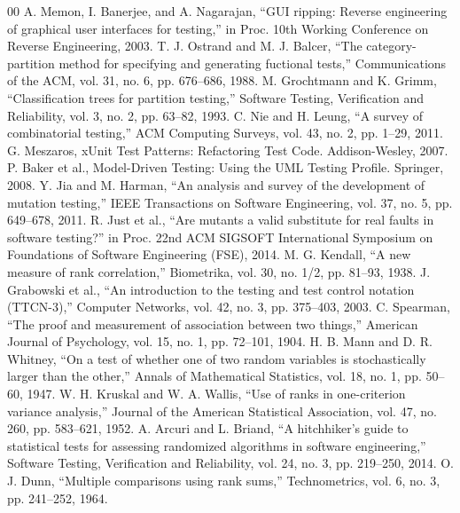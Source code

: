 \documentclass[conference]{IEEEtran}
\begin{document}
\begin{thebibliography}{00}
 A. Memon, I. Banerjee, and A. Nagarajan, ``GUI ripping: Reverse engineering of graphical user interfaces for testing,'' in Proc. 10th Working Conference on Reverse Engineering, 2003.
 T. J. Ostrand and M. J. Balcer, ``The category-partition method for specifying and generating fuctional tests,'' Communications of the ACM, vol. 31, no. 6, pp. 676--686, 1988.
 M. Grochtmann and K. Grimm, ``Classification trees for partition testing,'' Software Testing, Verification and Reliability, vol. 3, no. 2, pp. 63--82, 1993.
 C. Nie and H. Leung, ``A survey of combinatorial testing,'' ACM Computing Surveys, vol. 43, no. 2, pp. 1--29, 2011.
 G. Meszaros, xUnit Test Patterns: Refactoring Test Code. Addison-Wesley, 2007.
 P. Baker et al., Model-Driven Testing: Using the UML Testing Profile. Springer, 2008.
 Y. Jia and M. Harman, ``An analysis and survey of the development of mutation testing,'' IEEE Transactions on Software Engineering, vol. 37, no. 5, pp. 649--678, 2011.
 R. Just et al., ``Are mutants a valid substitute for real faults in software testing?'' in Proc. 22nd ACM SIGSOFT International Symposium on Foundations of Software Engineering (FSE), 2014.
 M. G. Kendall, ``A new measure of rank correlation,'' Biometrika, vol. 30, no. 1/2, pp. 81--93, 1938.
 J. Grabowski et al., ``An introduction to the testing and test control notation (TTCN-3),'' Computer Networks, vol. 42, no. 3, pp. 375--403, 2003.
 C. Spearman, ``The proof and measurement of association between two things,'' American Journal of Psychology, vol. 15, no. 1, pp. 72--101, 1904.
 H. B. Mann and D. R. Whitney, ``On a test of whether one of two random variables is stochastically larger than the other,'' Annals of Mathematical Statistics, vol. 18, no. 1, pp. 50--60, 1947.
 W. H. Kruskal and W. A. Wallis, ``Use of ranks in one-criterion variance analysis,'' Journal of the American Statistical Association, vol. 47, no. 260, pp. 583--621, 1952.
 A. Arcuri and L. Briand, ``A hitchhiker's guide to statistical tests for assessing randomized algorithms in software engineering,'' Software Testing, Verification and Reliability, vol. 24, no. 3, pp. 219--250, 2014.
 O. J. Dunn, ``Multiple comparisons using rank sums,'' Technometrics, vol. 6, no. 3, pp. 241--252, 1964.

\end{thebibliography}
\end{document}
